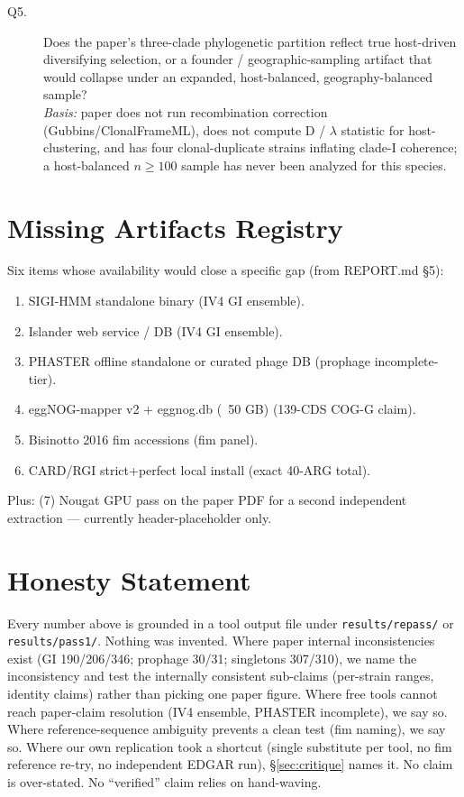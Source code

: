 \documentclass[11pt,a4paper]{article}
\begin{document}
\begin{description}
\item[Q5.] Does the paper's three-clade phylogenetic partition reflect true host-driven diversifying selection, or a founder / geographic-sampling artifact that would collapse under an expanded, host-balanced, geography-balanced sample? \\
\emph{Basis:} paper does not run recombination correction (Gubbins/ClonalFrameML), does not compute D / $\lambda$ statistic for host-clustering, and has four clonal-duplicate strains inflating clade-I coherence; a host-balanced $n \geq 100$ sample has never been analyzed for this species.
\end{description}

\section{Missing Artifacts Registry}
Six items whose availability would close a specific gap (from REPORT.md \S 5):
\begin{enumerate}
\item SIGI-HMM standalone binary (IV4 GI ensemble).
\item Islander web service / DB (IV4 GI ensemble).
\item PHASTER offline standalone or curated phage DB (prophage incomplete-tier).
\item eggNOG-mapper v2 + eggnog.db (~50 GB) (139-CDS COG-G claim).
\item Bisinotto 2016 fim accessions (fim panel).
\item CARD/RGI strict+perfect local install (exact 40-ARG total).
\end{enumerate}
Plus: (7) Nougat GPU pass on the paper PDF for a second independent extraction --- currently header-placeholder only.

\section{Honesty Statement}
Every number above is grounded in a tool output file under \texttt{results/repass/} or \texttt{results/pass1/}. Nothing was invented. Where paper internal inconsistencies exist (GI 190/206/346; prophage 30/31; singletons 307/310), we name the inconsistency and test the internally consistent sub-claims (per-strain ranges, identity claims) rather than picking one paper figure. Where free tools cannot reach paper-claim resolution (IV4 ensemble, PHASTER incomplete), we say so. Where reference-sequence ambiguity prevents a clean test (fim naming), we say so. Where our own replication took a shortcut (single substitute per tool, no fim reference re-try, no independent EDGAR run), \S\ref{sec:critique} names it. No claim is over-stated. No ``verified'' claim relies on hand-waving.
\end{document}
